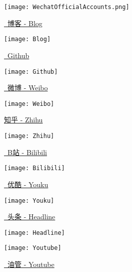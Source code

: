 \vspace*{-1.5ex}
\begin{figure}[h!]
    \begin{center}
        \texttt{[image: WechatOfficialAccounts.png]}
    \end{center}
    \vspace*{-6ex}

    \begin{minipage}[t]{0.22\textwidth}
        \caption*{\href{https://mister-kin.github.io}{\faBook\ 博客 - Blog}}
        \texttt{[image: Blog]}
    \end{minipage}
    \quad
    \begin{minipage}[t]{0.22\textwidth}
        \caption*{\href{https://github.com/mister-kin}{\faGithub\ Github}}
        \texttt{[image: Github]}
    \end{minipage}
    \quad
    \begin{minipage}[t]{0.22\textwidth}
        \caption*{\href{https://weibo.com/6270111192/profile?topnav=1&wvr=6&is_all=1}{\faWeibo\ 微博 - Weibo}}
        \texttt{[image: Weibo]}
    \end{minipage}
    \quad
    \begin{minipage}[t]{0.22\textwidth}
        \caption*{\href{https://www.zhihu.com/people/drwu-94}{知乎 - Zhihu}}
        \texttt{[image: Zhihu]}
    \end{minipage}

    \vspace*{1ex}

    \begin{minipage}[t]{0.22\textwidth}
        \caption*{\href{http://space.bilibili.com/17025250?}{\faTv\ B站 - Bilibili}}
        \texttt{[image: Bilibili]}
    \end{minipage}
    \quad
    \begin{minipage}[t]{0.22\textwidth}
        \caption*{\href{http://i.youku.com/i/UNjA3MTk5Mjgw?spm=a2hzp.8253869.0.0}{\faChevronCircleRight\ 优酷 - Youku}}
        \texttt{[image: Youku]}
    \end{minipage}
    \quad
    \begin{minipage}[t]{0.22\textwidth}
        \caption*{\href{https://www.toutiao.com/c/user/835254071079053/\#mid=1663279303982091}{\faNewspaperO\ 头条 - Headline}}
        \texttt{[image: Headline]}
    \end{minipage}
    \quad
    \begin{minipage}[t]{0.22\textwidth}
        \caption*{\href{https://www.youtube.com/channel/UCXqjfWLzMlRKxGC8syWj17Q?view_as=public}{\faYoutubePlay\ 油管 - Youtube}}
        \texttt{[image: Youtube]}
    \end{minipage}
\end{figure}
